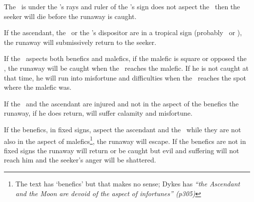 The \Moon\, is under the \Sun's rays and ruler of the \Sun's sign does not aspect the \Moon\, then the seeker will die before the runaway is caught. 

If the ascendant, the \Moon\, or the \Moon's dispositor are in a tropical sign (probably \Cancer\, or \Capricorn), the runaway will submissively return to the seeker.

If the \Moon\, aspects both benefics and malefics, if the malefic is square or opposed the \Moon, the runaway will be caught when the \Moon\, reaches the malefic. If he is not caught at that time, he will run into misfortune and difficulties when the \Moon\, reaches the spot where the malefic was. 

If the \Moon\, and the ascendant are injured and not in the aspect of the benefics the runaway, if he does return, will suffer calamity and misfortune. 

If the benefics, in fixed signs, aspect the ascendant and the \Moon\, while they are not also in the aspect of malefics\footnote{The text has `benefics' but that makes no sense; Dykes has  \textsl{``the Ascendant and the Moon are devoid of the aspect of infortunes'' (p305)}}, the runaway will escape. If the benefics are not in fixed signs the runaway will return or be caught but evil and suffering will not reach him and the seeker's anger will be shattered.






